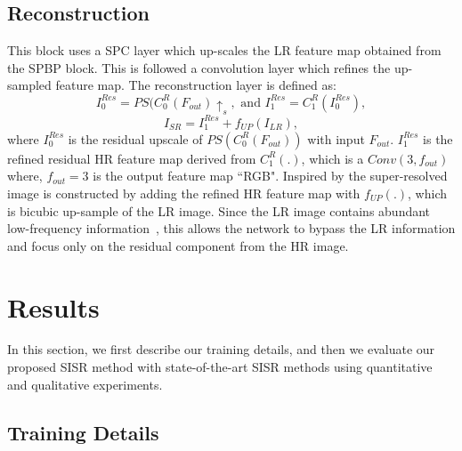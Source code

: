 \documentclass[a4paper,11pt]{article}
\begin{document}
\subsection{Reconstruction}
This block uses a SPC layer which up-scales the LR feature map obtained from the SPBP block. This is followed a convolution layer which refines the up-sampled feature map. The reconstruction layer is defined as:
  \begin{equation}
     {I}_{0}^{Res} = {PS}({C}_{0}^{R}({F}_{out})\uparrow_{s},
 \text{ and } 
     {I}_{1}^{Res} = {C}_{1}^{R}({I}_{0}^{Res}),
 \end{equation}
   \begin{equation}
     {I}_{SR} = {I}_{1}^{Res} + f_{UP}({I}_{LR}),
 \end{equation}
where ${I}_{0}^{Res}$ is the residual upscale of ${PS}({C}_{0}^{R}({F}_{out}))$ with input ${F}_{out}$. ${I}_{1}^{Res}$ is the refined residual HR feature map derived from ${C}_{1}^{R}(.)$, which is  a $Conv(3 ,f_{out})$ where, $f_{out} = 3$ is the output feature map ``RGB". Inspired by \cite{nvidiagwmt, SRFBN} the super-resolved image is constructed by adding the refined HR feature map with $f_{UP}(.)$, which is bicubic up-sample of the LR image. Since the LR image contains abundant low-frequency information~\cite{RCAN}, this allows the network to bypass the LR information and focus only on the residual component from the HR image.















  

\section{Results}
\label{results}

In this section, we first describe our training details, and then we evaluate our proposed SISR method with state-of-the-art SISR methods using quantitative and qualitative experiments.














\subsection{Training Details}
\end{document}
